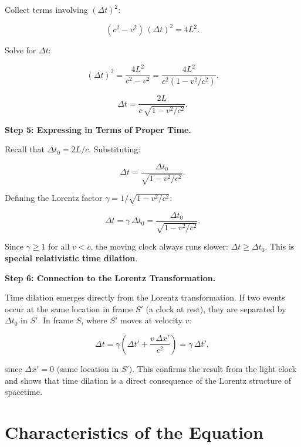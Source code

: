 Collect terms involving $(\Delta t)^2$:

\begin{equation}
(c^2 - v^2)\,(\Delta t)^2 = 4L^2.
\end{equation}

Solve for $\Delta t$:

\begin{equation}
(\Delta t)^2 = \frac{4L^2}{c^2 - v^2} = \frac{4L^2}{c^2\left(1 - v^2/c^2\right)}.
\end{equation}

\begin{equation}
\Delta t = \frac{2L}{c\,\sqrt{1 - v^2/c^2}}.
\end{equation}

\textbf{Step 5: Expressing in Terms of Proper Time.}

Recall that $\Delta t_0 = 2L/c$. Substituting:

\begin{equation}
\Delta t = \frac{\Delta t_0}{\sqrt{1 - v^2/c^2}}.
\end{equation}

Defining the Lorentz factor $\gamma = 1/\sqrt{1 - v^2/c^2}$:

\begin{equation}
\boxed{\Delta t = \gamma\,\Delta t_0 = \frac{\Delta t_0}{\sqrt{1 - v^2/c^2}}.}
\end{equation}

Since $\gamma \geq 1$ for all $v < c$, the moving clock always runs slower: $\Delta t \geq \Delta t_0$. This is \textbf{special relativistic time dilation}.

\textbf{Step 6: Connection to the Lorentz Transformation.}

Time dilation emerges directly from the Lorentz transformation. If two events occur at the same location in frame $S'$ (a clock at rest), they are separated by $\Delta t_0$ in $S'$. In frame $S$, where $S'$ moves at velocity $v$:

\begin{equation}
\Delta t = \gamma\left(\Delta t' + \frac{v\,\Delta x'}{c^2}\right) = \gamma\,\Delta t',
\end{equation}

since $\Delta x' = 0$ (same location in $S'$). This confirms the result from the light clock and shows that time dilation is a direct consequence of the Lorentz structure of spacetime.

\section*{Characteristics of the Equation}

